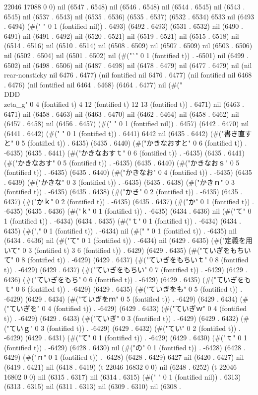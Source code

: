 22046 17088 0 0) nil (6547 . 6548) nil (6546 . 6548) nil (6544 . 6545) nil (6543 . 6545) nil (6537 . 6543) nil (6535 . 6536) (6535 . 6537) (6532 . 6534) 6533 nil (6493 . 6494) (#(" " 0 1 (fontified nil)) . 6493) (6492 . 6493) (6531 . 6532) nil (6490 . 6491) nil (6491 . 6492) nil (6520 . 6521) nil (6519 . 6521) nil (6515 . 6518) nil (6514 . 6516) nil (6510 . 6514) nil (6508 . 6509) nil (6507 . 6509) nil (6503 . 6506) nil (6502 . 6504) nil (6501 . 6502) nil (#("`" 0 1 (fontified t)) . -6501) nil (6499 . 6502) nil (6498 . 6506) nil (6487 . 6498) nil (6478 . 6479) nil (6477 . 6479) nil (nil rear-nonsticky nil 6476 . 6477) (nil fontified nil 6476 . 6477) (nil fontified nil 6468 . 6476) (nil fontified nil 6464 . 6468) (6464 . 6477) nil (#("\\DDD{\\zeta_g}" 0 4 (fontified t) 4 12 (fontified t) 12 13 (fontified t)) . 6471) nil (6463 . 6471) nil (6458 . 6463) nil (6463 . 6470) nil (6462 . 6464) nil (6458 . 6462) nil (6457 . 6458) nil (6456 . 6457) (#(" " 0 1 (fontified nil)) . 6457) (6442 . 6470) nil (6441 . 6442) (#(" " 0 1 (fontified t)) . 6441) 6442 nil (6435 . 6442) (#("書き直すと" 0 5 (fontified t)) . 6435) (6435 . 6440) (#("かきなおすと" 0 6 (fontified t)) . -6435) (6435 . 6441) (#("かきなおすｔ" 0 6 (fontified t)) . -6435) (6435 . 6441) (#("かきなおす" 0 5 (fontified t)) . -6435) (6435 . 6440) (#("かきなおｓ" 0 5 (fontified t)) . -6435) (6435 . 6440) (#("かきなお" 0 4 (fontified t)) . -6435) (6435 . 6439) (#("かきな" 0 3 (fontified t)) . -6435) (6435 . 6438) (#("かきｎ" 0 3 (fontified t)) . -6435) (6435 . 6438) (#("かき" 0 2 (fontified t)) . -6435) (6435 . 6437) (#("かｋ" 0 2 (fontified t)) . -6435) (6435 . 6437) (#("か" 0 1 (fontified t)) . -6435) (6435 . 6436) (#("ｋ" 0 1 (fontified t)) . -6435) (6434 . 6436) nil (#("て" 0 1 (fontified t)) . -6434) (6434 . 6435) (#("ｔ" 0 1 (fontified t)) . -6434) (6434 . 6435) (#("," 0 1 (fontified t)) . -6434) nil (#(" " 0 1 (fontified t)) . -6435) nil (6434 . 6436) nil (#("て" 0 1 (fontified t)) . -6434) nil (6429 . 6435) (#("定義を用いて" 0 3 (fontified t) 3 6 (fontified t)) . 6429) (6429 . 6435) (#("ていぎをもちいて" 0 8 (fontified t)) . -6429) (6429 . 6437) (#("ていぎをもちいｔ" 0 8 (fontified t)) . -6429) (6429 . 6437) (#("ていぎをもちい" 0 7 (fontified t)) . -6429) (6429 . 6436) (#("ていぎをもち" 0 6 (fontified t)) . -6429) (6429 . 6435) (#("ていぎをもｔ" 0 6 (fontified t)) . -6429) (6429 . 6435) (#("ていぎをも" 0 5 (fontified t)) . -6429) (6429 . 6434) (#("ていぎをｍ" 0 5 (fontified t)) . -6429) (6429 . 6434) (#("ていぎを" 0 4 (fontified t)) . -6429) (6429 . 6433) (#("ていぎｗ" 0 4 (fontified t)) . -6429) (6429 . 6433) (#("ていぎ" 0 3 (fontified t)) . -6429) (6429 . 6432) (#("ていｇ" 0 3 (fontified t)) . -6429) (6429 . 6432) (#("てい" 0 2 (fontified t)) . -6429) (6429 . 6431) (#("て" 0 1 (fontified t)) . -6429) (6429 . 6430) (#("ｔ" 0 1 (fontified t)) . -6429) (6428 . 6430) nil (#("の" 0 1 (fontified t)) . -6428) (6428 . 6429) (#("ｎ" 0 1 (fontified t)) . -6428) (6428 . 6429) 6427 nil (6420 . 6427) nil (6419 . 6421) nil (6418 . 6419) (t 22046 16832 0 0) nil (6248 . 6252) (t 22046 16802 0 0) nil (6315 . 6317) nil (6314 . 6315) (#(" " 0 1 (fontified nil)) . 6313) (6313 . 6315) nil (6311 . 6313) nil (6309 . 6310) nil (6308 . 
